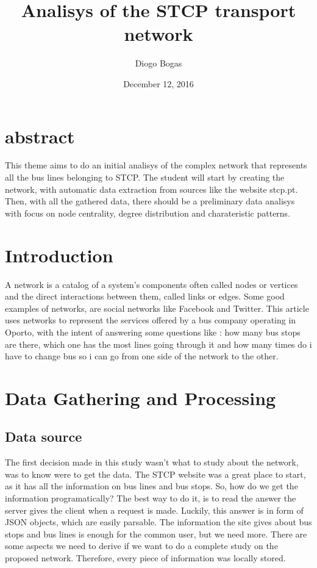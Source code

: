 \documentclass[12pt]{report}
\title{Analisys of the STCP transport network}
\author{Diogo Bogas}
\affil{DCC/FCUP}
\date{December 12, 2016}
\begin{document}
\maketitle
\newpage
{}

\section{abstract}
This theme aims to do an initial analisys of the complex network that represents all the bus lines belonging to STCP. The student will start by creating the network, with automatic data extraction from sources like the website stcp.pt.
Then, with all the gathered data, there should be a preliminary data analisys with focus on node centrality, degree distribution and charateristic patterns.


\section{Introduction}

A network is a catalog of a system’s components often called nodes or vertices and the direct interactions  between them, called links or edges.
Some good examples of networks, are social networks like Facebook and Twitter.
This article uses networks to represent the services offered by a bus company operating in Oporto, with the intent of answering some questions like : how many bus stops are there, which one has the most lines going through it and how many times do i have to change bus so i can go from one side of the network to the other. 
 

\section{Data Gathering and Processing}
\subsection{Data source}
The first decision made in this study wasn't what to study about the network, was to know were to get the data. 
The STCP website was a great place to start, as it has all the information on bus lines and bus stops. So, how do we get the information programatically?
The best way to do it, is to read the answer the server gives the client when a request is made. Luckily, this answer is in form of JSON objects, which are easily parsable.
The information the site gives about bus stops and bus lines is enough for the common user, but we need more. There are some aspects we need to derive if we want to do a complete study on the proposed network. Therefore, every piece of information was locally stored.
\end{document}
